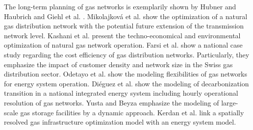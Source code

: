 The long-term planning of gas networks is exemplarily shown by Hubner and Haubrich \cite{hubner2008long} and Giehl et al. \cite{giehl2021modelling}.  Mikolajkov{\'a} et al. \cite{mikolajkova2017optimization} show the optimization of a natural gas distribution network with the potential future extension of the transmission network level. Kashani et al. \cite{kashani2014techno} present the techno-economical and environmental optimization of natural gas network operation. Farsi et al. \cite{farsi2007cost} show a national case study regarding the cost efficiency of gas distribution networks. Particularly, they emphasize the impact of customer density and network size in the Swiss gas distribution sector. Odetayo et al. \cite{odetayo2018real} show the modeling flexibilities of gas networks for energy system operation. Di{\'e}guez et al. \cite{dieguez2021modelling} show the modeling of decarbonization transition in a national integrated energy system including hourly operational resolution of gas networks. Yusta and Beyza \cite{yusta2021optimal} emphasize the modeling of large-scale gas storage facilities by a dynamic approach. Kerdan et al. \cite{kerdan2019modelling} link a spatially resolved gas infrastructure optimization model with an energy system model.\vspace{0.3cm}

